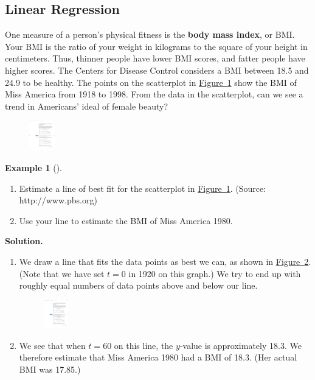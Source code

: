 \documentclass[10pt,]{book}
\newcommand{\terminology}[1]{\textbf{#1}}
\theoremstyle{plain}
\theoremstyle{definition}
\theoremstyle{definition}
\theoremstyle{definition}
\newtheorem{example}[theorem]{Example}
\theoremstyle{definition}
\theoremstyle{definition}
\numberwithin{equation}{section}
\begin{document}
\subsection[Linear Regression]{Linear Regression}\label{subsection-30}

        One measure of a person's physical fitness is the \terminology{body mass index}, or BMI. Your BMI is the ratio of your weight in kilograms to the square of your height in centimeters. Thus, thinner people have lower BMI scores, and fatter people have higher scores. The Centers for Disease Control considers a BMI between 18.5 and 24.9 to be healthy. The points on the scatterplot in \hyperref[fig-BMI]{Figure~\ref{fig-BMI}} show the BMI of Miss America from 1918 to 1998. From the data in the scatterplot, can we see a trend in Americans’ ideal of female beauty?
\leavevmode%
\begin{figure}
\centering
\includegraphics[width=0.100\textwidth,]{images/fig-BMI.pdf}\caption{\label{fig-BMI}}
\end{figure}
\begin{example}[]\label{example-BMI}
\leavevmode%
\begin{enumerate}[label=*\alph**]
\item\hypertarget{li-193}{}Estimate a line of best fit for the scatterplot in \hyperref[fig-BMI]{Figure~\ref{fig-BMI}}. (Source: http://www.pbs.org)\item\hypertarget{li-194}{}Use your line to estimate the BMI of Miss America 1980.\end{enumerate}
\par\medskip\noindent%
\textbf{Solution.}\quad \leavevmode%
\begin{enumerate}[label=*\alph**]
\item\hypertarget{li-195}{}We draw a line that fits the data points as best we can, as shown in \hyperref[fig-BMI2]{Figure~\ref{fig-BMI2}}. (Note that we have set \(t = 0\) in 1920 on this graph.) We try to end up with roughly equal numbers of data points above and below our line. 
        \leavevmode%
\begin{figure}
\centering
\includegraphics[width=0.100\textwidth,]{images/fig-BMI2.pdf}\caption{\label{fig-BMI2}}
\end{figure}
\item\hypertarget{li-196}{}We see that when \(t = 60\) on this line, the \(y\)-value is approximately 18.3. We therefore estimate that Miss America 1980 had a BMI of 18.3. (Her actual BMI was 17.85.)\end{enumerate}
\end{example}
\end{document}
